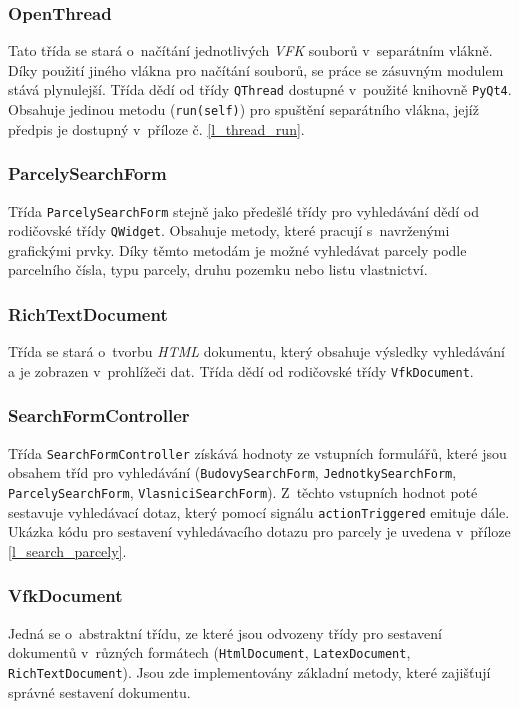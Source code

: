 \documentclass[a4paper,12pt,oneside]{book}
\begin{document}
\subsubsection{OpenThread}
Tato třída se stará o~načítání jednotlivých \textit{VFK} souborů v~separátním vlákně. Díky použití jiného vlákna pro načítání souborů, se práce se zásuvným modulem stává plynulejší. Třída dědí od třídy \texttt{QThread} dostupné v~použité knihovně \texttt{PyQt4}. Obsahuje jedinou metodu (\texttt{run(self)}) pro spuštění separátního vlákna, jejíž předpis je dostupný v~příloze č. \ref{l_thread_run}.

\subsubsection{ParcelySearchForm}
Třída \texttt{ParcelySearchForm} stejně jako předešlé třídy pro vyhledávání dědí od rodičovské třídy \texttt{QWidget}. Obsahuje metody, které pracují s~navrženými grafickými prvky. Díky těmto metodám je možné vyhledávat parcely podle parcelního čísla, typu parcely, druhu pozemku nebo listu vlastnictví.

\subsubsection{RichTextDocument}
Třída se stará o~tvorbu \textit{HTML} dokumentu, který obsahuje výsledky vyhledávání a je zobrazen v~prohlížeči dat. Třída dědí od rodičovské třídy \texttt{VfkDocument}. 

\subsubsection{SearchFormController}
Třída \texttt{SearchFormController} získává hodnoty ze vstupních formulářů, které jsou obsahem tříd pro vyhledávání  (\texttt{BudovySearchForm}, \texttt{JednotkySearchForm}, \texttt{Par\-celySearchForm}, \texttt{VlasniciSearchForm}). Z~těchto vstupních hodnot poté sestavuje vyhledávací dotaz, který pomocí signálu \texttt{actionTriggered} emituje dále. Ukázka kódu pro sestavení vyhledávacího dotazu pro parcely je uvedena v~příloze \ref{l_search_parcely}.

\subsubsection{VfkDocument}
\label{l_vfkDocument}
Jedná se o~abstraktní třídu, ze které jsou odvozeny třídy pro sestavení dokumentů v~různých formátech (\texttt{HtmlDocument}, \texttt{LatexDocument}, \texttt{RichTextDocument}). Jsou zde implementovány základní metody, které zajišťují správné sestavení dokumentu.
\end{document}
